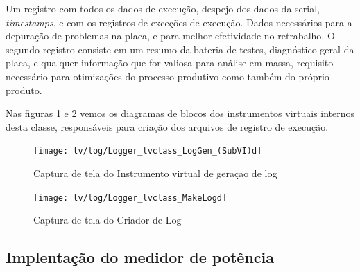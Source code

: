             Um registro com todos os dados de execução, despejo dos dados da serial, \textit{timestamps}, e com os registros de exceções de execução. Dados necessários para a depuração de problemas na placa, e para melhor efetividade no retrabalho.
            O segundo registro consiste em um resumo da bateria de testes, diagnóstico geral da placa, e qualquer informação que for valiosa para análise em massa, requisito necessário para otimizações do processo produtivo como também do próprio produto.
            
            Nas figuras \ref{fig:loggen} e \ref{fig:logmake} vemos os diagramas de blocos dos instrumentos virtuais internos desta classe, responsáveis para criação dos arquivos de registro de execução.
            

            
            
            \begin{figure}
                \centering
                \texttt{[image: lv/log/Logger\_lvclass\_LogGen\_(SubVI)d]}
                \caption{Captura de tela do Instrumento virtual de geraçao de log}
                \label{fig:loggen}
            \end{figure}
            \begin{figure}
                \centering
                \texttt{[image: lv/log/Logger\_lvclass\_MakeLogd]}
                \caption{Captura de tela do Criador  de Log}
                \label{fig:logmake}
            \end{figure}
            \clearpage   
        \subsection{Implentação do medidor de potência}
            
